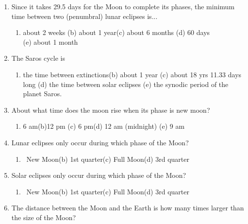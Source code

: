 \documentclass[12pt,thmsa]{article}
\begin{document}
\begin{enumerate}
\item  Since it takes 29.5 days for the Moon to complete its phases, the
minimum time between two (penumbral) lunar eclipses is...

\begin{enumerate}
\item  about 2 weeks \qquad (b) about 1 year\qquad (c) about 6 months \qquad
(d) 60 days \\ (e) about 1 month
\end{enumerate}

\item  The Saros cycle is

\begin{enumerate}
\item  the time between extinctions\qquad (b) about 1 year \qquad (c) 
about 18 yrs 11.33 days long \qquad (d)
the time between solar eclipses \qquad (e) the synodic period of the planet
Saros.
\end{enumerate}

\item  About what time does the moon rise when its phase is new moon?

\begin{enumerate}
\item  6 am\qquad (b)12 pm \qquad (c) 6 pm\qquad (d) 12 am (midnight)\qquad
(e) 9 am
\end{enumerate}

\item  Lunar eclipses only occur during which phase of the Moon?

\begin{enumerate}
\item  \ New Moon\qquad (b) 1st quarter\qquad (c) Full Moon\qquad (d) 3rd
quarter\qquad
\end{enumerate}

\newpage

\item  Solar eclipses only occur during which phase of the Moon?

\begin{enumerate}
\item  \ New Moon\qquad (b) 1st quarter\qquad (c) Full Moon\qquad (d) 3rd
quarter\qquad
\end{enumerate}

\item  The distance between the Moon and the Earth is how many times larger
than the size of the Moon?


\end{enumerate}
\end{document}
